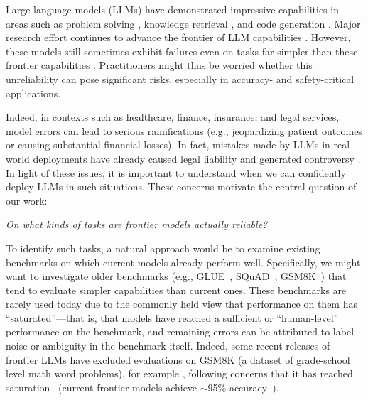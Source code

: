 Large language models (LLMs) have demonstrated impressive capabilities in areas such as problem solving \cite{hao2023reasoning,openai2024o1}, knowledge retrieval \cite{gao2023retrieval}, and code generation \cite{guo2024deepseek,jimenez2024swebench}. Major research effort continues to advance the frontier of LLM capabilities \cite{Claude35ModelCardAddendum,openai2023gpt4}. However, these models still sometimes exhibit failures even on tasks far simpler than these frontier capabilities \cite{yang2024can,nezhurina2024alice}. 
Practitioners might thus be worried whether this unreliability can pose significant risks, especially in accuracy- and safety-critical applications.





Indeed, in contexts such as healthcare, finance, insurance, and legal services, model errors can lead to serious ramifications (e.g., jeopardizing patient outcomes or causing substantial financial losses).
In fact, mistakes made by LLMs in real-world deployments have already caused legal liability \cite{moffatt2024civil} and generated controversy \cite{masse2023a}. In light of these issues, it is important to understand when we can confidently deploy LLMs in such situations. These concerns motivate the central question of our work:


\begin{center}
    {\em On what kinds of tasks are frontier models actually reliable?}
\end{center}

To identify such tasks, a natural approach would be to examine existing benchmarks on which current models already perform well.
Specifically, we might want to investigate older benchmarks (e.g., GLUE~\citep{wang2018glue}, SQuAD~\citep{rajpurkar2016squad}, GSM8K~\citep{dvijotham2018training}) that tend to evaluate simpler capabilities than current ones.
These benchmarks are rarely used today due to the commonly held view that performance on them has ``saturated''---that is, that models have reached a sufficient or ``human-level'' performance on the benchmark, and remaining errors can be attributed to  label noise or ambiguity in the benchmark itself. 
Indeed, some recent releases of frontier LLMs have excluded evaluations on GSM8K (a dataset of grade-school level math word problems), for example \cite{openai2024o1,anthropic2024claude}, following concerns that it has reached saturation~\cite{hendersontweet} (current frontier models achieve $\sim$95\% accuracy~\cite{dubey2024llama,Claude35ModelCardAddendum}).




